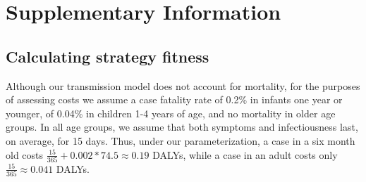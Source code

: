 \documentclass[12pt]{article}
\begin{document}


\clearpage




\setcounter{figure}{0}
\renewcommand{\thefigure}{S\arabic{figure}}


\setcounter{page}{1}
\renewcommand{\thepage}{S\arabic{page}}





\section*{Supplementary Information}

\subsection*{Calculating strategy fitness}

Although our transmission model does not account for mortality, 
for the purposes of assessing costs
we assume a case fatality rate of 
0.2\% in infants one year or younger,
of 0.04\% in children 1-4 years of age\cite{},
and no mortality in older age groups. In all age groups,
we assume that both symptoms and infectiousness 
last, on average, for 15 days.
Thus, under our parameterization,
a case in a six month old costs
$\frac{15}{365} + 0.002 * 74.5 \approx 0.19$ DALYs,
while a case in an adult costs only 
$\frac{15}{365} \approx 0.041$ DALYs.
\end{document}
